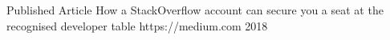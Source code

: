 


\begin{cvhonors}

  \cvhonor
    {Published Article} %
    {How a StackOverflow account can secure you a seat at the recognised developer table} %
    {https://medium.com} %
    {2018} %

\end{cvhonors}


